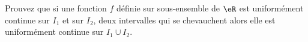 
\begin{exercice}\label{exo0092}


Prouvez que si une fonction $f$ définie sur sous-ensemble de $\eR$ est uniformément continue sur $I_1$ et sur $I_2$, deux intervalles qui se chevauchent alors elle est uniformément continue sur $I_1 \cup I_2$.

\end{exercice}
